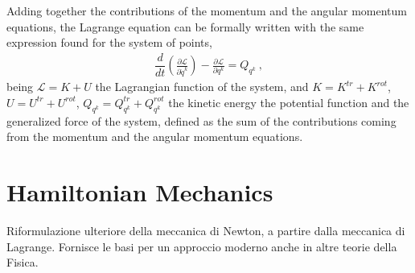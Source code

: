 \documentclass[letterpaper,10pt,english]{jupyterBook}
\begin{document}
\sphinxAtStartPar
Adding together the contributions of the momentum and the angular momentum equations, the Lagrange equation can be formally written with the same expression found for the system of points,
\begin{equation*}
\begin{split}\dfrac{d}{dt}\left(\frac{\partial \mathscr{L}}{\partial \dot{q}^k}\right) - \frac{\partial \mathscr{L}}{\partial q^k} = Q_{q^k} \ ,\end{split}
\end{equation*}
\sphinxAtStartPar
being \(\mathscr{L} = K + U\) the Lagrangian function of the system, and \(K = K^{tr} + K^{rot}\), \(U = U^{tr} + U^{rot}\), \(Q_{q^k} = Q_{q^k}^{tr} + Q_{q^k}^{rot}\) the kinetic energy the potential function and the generalized force of the system, defined as the sum of the contributions coming from the momentum and the angular momentum equations.



\sphinxstepscope




\chapter{Hamiltonian Mechanics}
\label{\detokenize{ch/hamilton:hamiltonian-mechanics}}\label{\detokenize{ch/hamilton:classical-mechanics-hamilton}}\label{\detokenize{ch/hamilton::doc}}
\sphinxAtStartPar
Riformulazione ulteriore della meccanica di Newton, a partire dalla meccanica di Lagrange.
Fornisce le basi per un approccio moderno anche in altre teorie della Fisica. 
\end{document}
